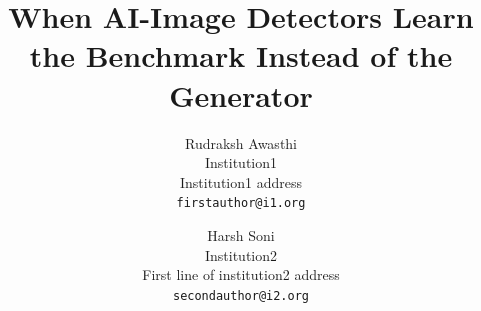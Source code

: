 \documentclass[10pt,twocolumn,letterpaper]{article}
\title{When AI-Image Detectors Learn the Benchmark Instead of the Generator}
\author{Rudraksh Awasthi \\
Institution1\\
Institution1 address\\
{\tt\small firstauthor@i1.org}
\and
Harsh Soni\\ 
Institution2\\
First line of institution2 address\\
{\tt\small secondauthor@i2.org}
}
\begin{document}
\maketitle







{
    \small
    
    
}

% 
\end{document}
